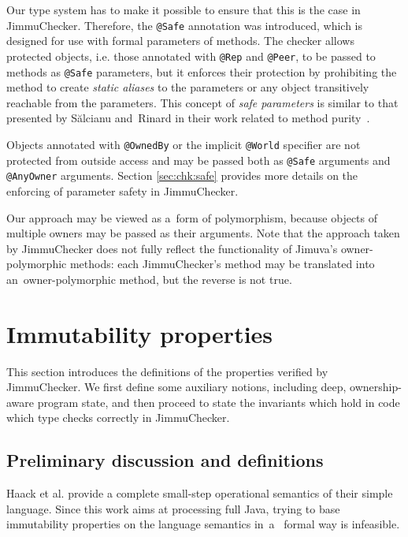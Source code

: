\documentclass{pracamgr}
\theoremstyle{break}
\theoremstyle{break}
\theoremstyle{break}
\begin{document}
Our type system has to make it possible to ensure that this is the
case in JimmuChecker. Therefore, the \texttt{@Safe} annotation was
introduced, which is designed for use with formal parameters of
methods. The checker allows protected objects, i.e. those annotated
with \texttt{@Rep} and \texttt{@Peer}, to be passed to methods as
\texttt{@Safe} parameters, but it enforces their protection by
prohibiting the method to create \emph{static aliases} to the
parameters or any object transitively reachable from the
parameters. This concept of \emph{safe parameters} is similar to that
presented by Sălcianu and~Rinard in their work related to method
purity~\cite{purity}.

Objects annotated with \texttt{@OwnedBy} or the implicit
\texttt{@World} specifier are not protected from outside access and
may be passed both as \texttt{@Safe} arguments and \texttt{@AnyOwner}
arguments.  Section \ref{sec:chk:safe} provides more details on the
enforcing of parameter safety in JimmuChecker.

Our approach may be viewed as a~form of polymorphism, because objects
of multiple owners may be passed as their arguments. Note that the
approach taken by JimmuChecker does not fully reflect the
functionality of Jimuva's owner-polymorphic methods: each
JimmuChecker's method may be translated into an~owner-polymorphic
method, but the reverse is not true.

\section{Immutability properties}
\label{sec:properties}

This section introduces the definitions of the properties verified by
JimmuChecker. We first define some auxiliary notions, including deep,
ownership-aware program state, and then proceed to state the
invariants which hold in code which type checks correctly in
JimmuChecker.

\subsection{Preliminary discussion and definitions}

Haack et al. provide a complete small-step operational semantics of
their simple language. Since this work aims at processing full Java,
trying to base immutability properties on the language semantics in~a~
formal way is infeasible.
\end{document}
